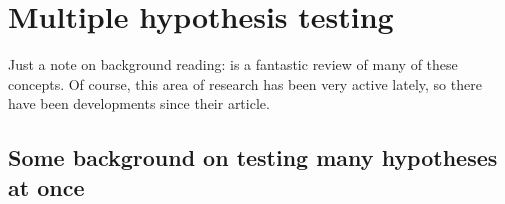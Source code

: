 

\chapter{Multiple hypothesis testing}

Just a note on background reading: \citet{RSW08} is a fantastic review
of many of these concepts. Of course, this area of research has been
very active lately, so there have been developments since their
article.

  \section{Some background on testing many hypotheses at once}

